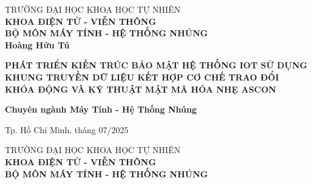 \begin{titlepage}
\thispagestyle{empty}
\begin{center}
TRƯỜNG ĐẠI HỌC KHOA HỌC TỰ NHIÊN\\
\textbf{KHOA ĐIỆN TỬ - VIỄN THÔNG}\\
\textbf{BỘ MÔN MÁY TÍNH - HỆ THỐNG NHÚNG}\\[2cm]



{ \Large \bfseries Hoàng Hữu Tú\\[2cm] } 


{ \Large \bfseries PHÁT TRIỂN KIẾN TRÚC BẢO MẬT HỆ THỐNG IOT SỬ DỤNG KHUNG TRUYỀN DỮ LIỆU KẾT HỢP CƠ CHẾ TRAO ĐỔI KHÓA ĐỘNG VÀ KỸ THUẬT MẬT MÃ HÓA NHẸ ASCON\\[3cm]} 


\Large \bfseries Chuyên ngành Máy Tính - Hệ Thống Nhúng



\vfill
Tp. Hồ Chí Minh, tháng 07/2025

\end{center}

\pagebreak


\thispagestyle{empty}
\begin{center}

TRƯỜNG ĐẠI HỌC KHOA HỌC TỰ NHIÊN\\
\textbf{KHOA ĐIỆN TỬ - VIỄN THÔNG}\\
\textbf{BỘ MÔN MÁY TÍNH - HỆ THỐNG NHÚNG}\\[2cm]



\end{center}
\end{titlepage}
